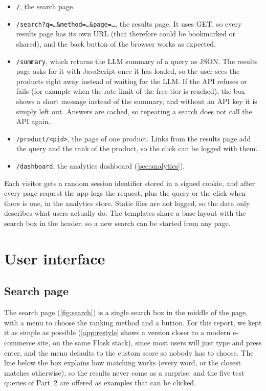 \documentclass[11pt,a4paper]{article}
\begin{document}
\begin{itemize}
  \item \texttt{/}, the search page.
  \item \texttt{/search?q=\ldots\&method=\ldots\&page=\ldots}, the results page. It uses GET, so every results page has its own URL (that therefore could be bookmarked or shared), and the back button of the browser works as expected.
  \item \texttt{/summary}, which returns the LLM summary of a query as JSON. The results page asks for it with JavaScript once it has loaded, so the user sees the products right away instead of waiting for the LLM. If the API refuses or fails (for example when the rate limit of the free tier is reached), the box shows a short message instead of the summary, and without an API key it is simply left out. Answers are cached, so repeating a search does not call the API again.
  \item \texttt{/product/<pid>}, the page of one product. Links from the results page add the query and the rank of the product, so the click can be logged with them.
  \item \texttt{/dashboard}, the analytics dashboard (\cref{sec:analytics}).
\end{itemize}

Each visitor gets a random session identifier stored in a signed cookie, and after every page request the app logs the request, plus the query or the click when there is one, in the analytics store. Static files are not logged, so the data only describes what users actually do. The templates share a base layout with the search box in the header, so a new search can be started from any page.

\section{User interface}
\label{sec:ui}
\subsection{Search page}

The search page (\cref{fig:search}) is a single search box in the middle of the page, with a menu to choose the ranking method and a button. For this report, we kept it as simple as possible (\cref{app:restyle} shows a version closer to a modern e-commerce site, on the same Flask stack), since most users will just type and press enter, and the menu defaults to the custom score so nobody has to choose. The line below the box explains how matching works (every word, or the closest matches otherwise), so the results never come as a surprise, and the five test queries of Part~2 are offered as examples that can be clicked.
\end{document}
